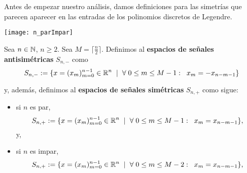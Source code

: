Antes de empezar nuestro análisis, damos definiciones
para las simetrías que parecen aparecer en las entradas
de los polinomios discretos de Legendre.

\begin{marginfigure}
\texttt{[image: n\_parImpar]} 
\end{marginfigure}


\begin{defi}
\label{def: espacios de seniales simetricas y antisimetricas}
Sea $n \in \mathbb{N}$, $n \geq 2$. 
Sea $M = \lceil \frac{n}{2} \rceil$.
Definimos al 
\textbf{espacios de señales antisimétricas} $S_{n,-}$ como 
	\begin{equation}
	\label{eq1: 5Dic}
	S_{n, -}:= \{ x=(x_{m})_{m=0}^{n-1}  \in \mathbb{R}^{n}
	\hspace{0.2cm} |
	\hspace{0.2cm} \forall  
	\hspace{0.1cm}
	0 \leq m \leq M-1 : \hspace{0.2cm} x_{m}= -x_{n-m-1}\}
	\end{equation}

\noindent	
y, además, definimos al
\textbf{espacios de señales simétricas} $S_{n,+}$ como sigue:

\begin{itemize}
	\item si $n$ es par, 
	\begin{equation}
	\label{eq0: 5Dic}
	S_{n, +}:= \{ x=(x_{m})_{m=0}^{n-1} \in \mathbb{R}^{n} \hspace{0.2cm} 
	| \hspace{0.2cm} \forall  
	\hspace{0.1cm}
	0 \leq m \leq M-1 : \hspace{0.2cm} x_{m}= x_{n-m-1}\},
	\end{equation}
	y,
	
	\item si $n$ es impar,
	\begin{equation}
	\label{eq0: 5Dic}
	S_{n, +}:= \{ x=(x_{m})_{m=0}^{n-1} \in \mathbb{R}^{n} \hspace{0.2cm} 
	| \hspace{0.2cm} \forall  
	\hspace{0.1cm}
	0 \leq m \leq M-2 : \hspace{0.2cm} x_{m}= x_{n-m-1}\},
	\end{equation}
	
\end{itemize}
\end{defi}


